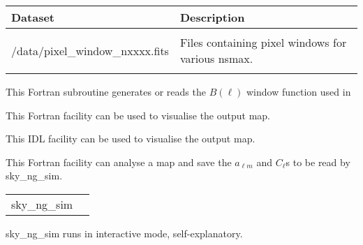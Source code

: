 \begin{datasets}
{
\begin{tabular}{p{0.3\hsize} p{0.35\hsize}} \hline  
  \textbf{Dataset} & \textbf{Description} \\ \hline
                   &                      \\ %
  /data/pixel\_window\_nxxxx.fits & Files containing pixel windows for
                   various nsmax.\\ 
                   &                      \\ \hline %
\end{tabular}
} 
\end{datasets}

\begin{support}
  \begin{sulist}{} %
  \item[\htmlref{generate\_beam}{sub:generate_beam}] This \healpix Fortran
subroutine generates or reads the $B(\ell)$ window function used in \thedocid
  \item[\htmlref{map2gif}{fac:map2gif}] This \healpix Fortran facility can be used to visualise the
  output map.
  \item[\htmlref{mollview}{idl:mollview}] This \healpix IDL facility can be used to visualise the
  output map.
  \item[\htmlref{anafast}{fac:anafast}] This \healpix Fortran facility can analyse a \healpix map and 
     	       save the $a_{\ell m}$ and $C_\ell$s to be read by sky\_ng\_sim.
		
  \end{sulist}
\end{support}

\begin{examples}{1}
{
\begin{tabular}{ll} %
sky\_ng\_sim  \\
\end{tabular}
}
{
sky\_ng\_sim runs in interactive mode, self-explanatory.
}
\end{examples}


